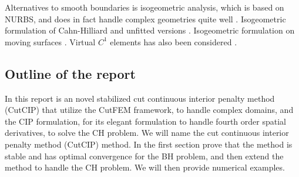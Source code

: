 Alternatives to smooth boundaries is isogeometric analysis, which is based on NURBS, and does in fact handle complex geometries quite well \cite{hughes2005isogeometric}.
 Isogeometric formulation of Cahn-Hilliard \cite{kastner2016isogeometric, gomez2008isogeometric} and unfitted versions \cite{zhao2017variational}. Isogeometric formulation on moving
surfaces \cite{zimmermann2019isogeometric}. Virtual $C^{1}$  elements has also been considered \cite{antonietti2016c}.


\subsection{Outline of the report}%
\label{sub:outline_of_the_report}

In this report is an novel stabilized cut continuous interior penalty method (CutCIP) that utilize the CutFEM framework, to handle complex domains, and the CIP formulation, for its elegant formulation to handle fourth order spatial derivatives, to solve
the CH problem. We will name the cut continuous interior penalty method (CutCIP) method. In the first section  prove that the method is stable and has optimal
convergence for the BH problem, and then extend the method to handle the CH problem. We will then provide numerical examples.

